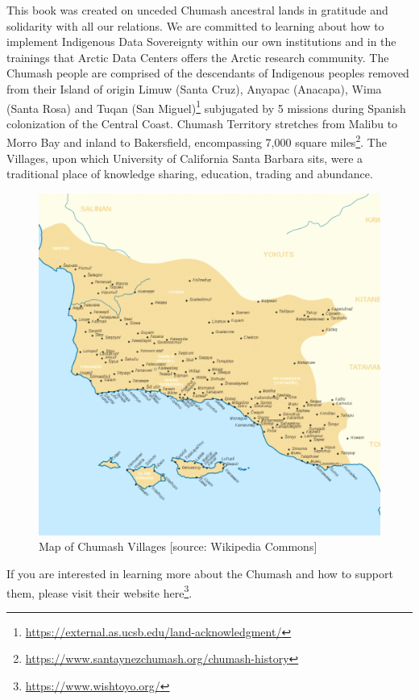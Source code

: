 \documentclass[
  11pt,
  paperpaper,
  openany]{book}
\DeclareRobustCommand{\href}[2]{#2\footnote{\url{#1}}}
\begin{document}
This book was created on unceded Chumash ancestral lands in gratitude and solidarity with all our relations. We are committed to learning about how to implement Indigenous Data Sovereignty within our own institutions and in the trainings that Arctic Data Centers offers the Arctic research community.
The Chumash people are comprised of the descendants of Indigenous peoples removed from their Island of origin \href{https://external.as.ucsb.edu/land-acknowledgment/}{Limuw (Santa Cruz), Anyapac (Anacapa), Wima (Santa Rosa) and Tuqan (San Miguel)} subjugated by 5 missions during Spanish colonization of the Central Coast. Chumash Territory stretches from Malibu to Morro Bay and inland to Bakersfield, encompassing \href{https://www.santaynezchumash.org/chumash-history}{7,000 square miles}. The Villages, upon which University of California Santa Barbara sits, were a traditional place of knowledge sharing, education, trading and abundance.

\begin{figure}
\includegraphics[width=1\linewidth]{images/chumash_territory} \caption{Map of Chumash Villages [source: Wikipedia Commons]}\label{fig:unnamed-chunk-1}
\end{figure}

If you are interested in learning more about the Chumash and how to support them, please visit their website \href{https://www.wishtoyo.org/}{here}.
\end{document}
